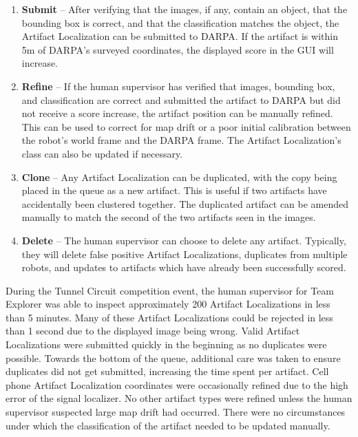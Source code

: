 \begin{enumerate}
	\item \textbf{Submit} -- After verifying that the images, if any, contain an object, that the bounding box is correct, and that the classification matches the object, the Artifact Localization can be submitted to DARPA. If the artifact is within 5m of DARPA's surveyed coordinates, the displayed score in the GUI will increase.
	\item \textbf{Refine} -- If the human supervisor has verified that images, bounding box, and classification are correct and submitted the artifact to DARPA but did not receive a score increase, the artifact position can be manually refined. This can be used to correct for map drift or a poor initial calibration between the robot's world frame and the DARPA frame. The Artifact Localization's class can also be updated if necessary.
	\item \textbf{Clone} -- Any Artifact Localization can be duplicated, with the copy being placed in the queue as a new artifact. This is useful if two artifacts have accidentally been clustered together. The duplicated artifact can be amended manually to match the second of the two artifacts seen in the images.
	\item \textbf{Delete} -- The human supervisor can choose to delete any artifact. Typically, they will delete false positive Artifact Localizations, duplicates from multiple robots, and updates to artifacts which have already been successfully scored.
\end{enumerate}

During the Tunnel Circuit competition event, the human supervisor for Team Explorer was able to inspect approximately 200 Artifact Localizations in less than 5 minutes. Many of these Artifact Localizations could be rejected in less than 1 second due to the displayed image being wrong. Valid Artifact Localizations were submitted quickly in the beginning as no duplicates were possible. Towards the bottom of the queue, additional care was taken to ensure duplicates did not get submitted, increasing the time spent per artifact. Cell phone Artifact Localization coordinates were occasionally refined due to the high error of the signal localizer. No other artifact types were refined unless the human supervisor suspected large map drift had occurred. There were no circumstances under which the classification of the artifact needed to be updated manually.